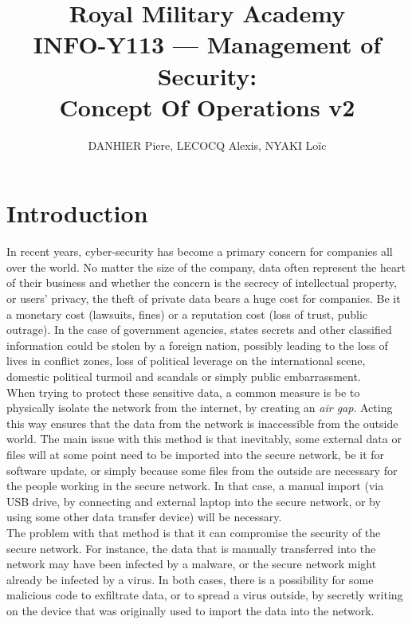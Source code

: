 \documentclass[a4paper,11pt]{article}
\title{Royal Military Academy\\
	INFO-Y113 --- Management of Security: \\
	Concept Of Operations v2}
\author{DANHIER Piere, LECOCQ Alexis, NYAKI Loïc}
\begin{document}
\maketitle
\newpage
\tableofcontents

\newpage

\section{Introduction}
In recent years, cyber-security has become a primary concern for companies all over the world. No matter the size of the company, data often represent the heart of their business and whether the concern is the secrecy of intellectual property, or users' privacy, the theft of private data bears a huge cost for companies. Be it a monetary cost (lawsuits, fines) or a reputation cost (loss of trust, public outrage). In the case of government agencies, states secrets and other classified information could be stolen by a foreign nation, possibly leading to the loss of lives in conflict zones, loss of political leverage on the international scene, domestic political turmoil and scandals or simply public embarrassment.\\

When trying to protect these sensitive data, a common measure is be to physically isolate the network from the internet, by creating an \textit{air gap}. Acting this way ensures that the data from the network is inaccessible from the outside world. The main issue with this method is that inevitably, some external data or files will at some point need to be imported into the secure network, be it for software update, or simply because some files from the outside are necessary for the people working in the secure network. In that case, a manual import (via USB drive, by connecting and external laptop into the secure network, or by using some other data transfer device) will be necessary.\\

The problem with that method is that it can compromise the security of the secure network. For instance, the data that is manually transferred into the network may have been infected by a malware, or the secure network might already be infected by a virus. In both cases, there is a possibility for some malicious code to exfiltrate data, or to spread a virus outside, by secretly writing on the device that was originally used to import the data into the network.\\
\end{document}
